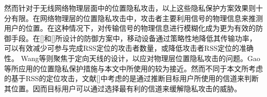 然而针对于无线网络物理层面中的位置隐私攻击，以上这些隐私保护方案效果则十分有限。在网络物理层的位置隐私攻击中，攻击者主要利用信号的物理信息来推测用户的位置。在这种情况下，对传输信号的物理信息进行模糊化成为更为有效的防御手段。在[]和[]所设计的防御方案中，移动设备通过策略性地降低其传输功率，可以有效减少可参与完成RSS定位的攻击者数量，或降低攻击者RSS定位的准确性。 Wang等\cite{Ting11}则聚焦于定向天线的设计，以应对物理层位置隐私攻击的问题。Gao等\cite{location}所应用的位置隐私保护措施与本文中所使用的较为接近。然而不同于本文所考虑的基于RSS的定位攻击，文献[]中考虑的是通过推断目标用户所使用的信道来判断其位置。因而目标用户可以通过选择最有利的信道来缓解隐私攻击的威胁。



